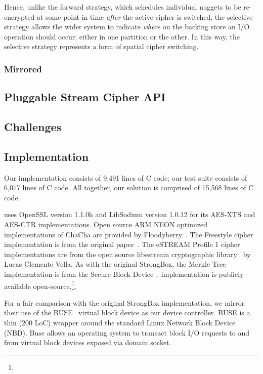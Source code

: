 Hence, unlike the forward strategy, which schedules individual nuggets to be
re-encrypted at some point in time \emph{after} the active cipher is switched,
the selective strategy allows the wider system to indicate \emph{where} on the
backing store an I/O operation should occur: either in one partition or the
other. In this way, the selective strategy represents a form of spatial cipher
switching.

\subsubsection{Mirrored}


\subsection{Pluggable Stream Cipher API}


\subsection{Challenges}



\subsection{Implementation}

Our \SYSTEM{} implementation consists of 9,491 lines of C code; our test suite
consists of 6,077 lines of C code. All together, our solution is comprised of
15,568 lines of C code.

\SYSTEM{} uses OpenSSL version 1.1.0h and LibSodium version 1.0.12 for its
AES-XTS and AES-CTR implementations. Open source ARM NEON optimized
implementations of ChaCha are provided by Floodyberry~\cite{Floodyberry}. The
Freestyle cipher implementation is from the original paper~\cite{Freestyle}. The
eSTREAM Profile 1 cipher implementations are from the open source libestream
cryptographic library~\cite{libestream} by Lucas Clemente Vella. As with the
original StrongBox, the Merkle Tree implementation is from the Secure Block
Device~\cite{SBD}. \SYSTEM{} implementation is publicly available
open-source.\footnote{\SystemURI}.

For a fair comparison with the original StrongBox implementation, we mirror
their use of the BUSE~\cite{BUSE} virtual block device as our device controller.
BUSE is a thin (200 LoC) wrapper around the standard Linux Network Block Device
(NBD). Buse allows an operating system to transact block I/O requests to and
from virtual block devices exposed via domain socket.

